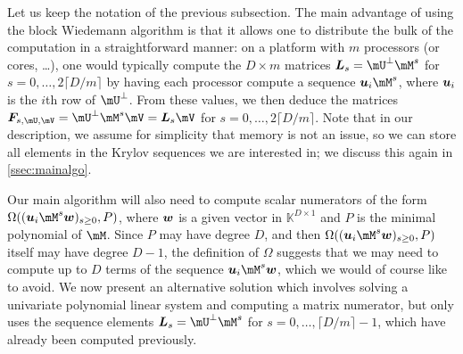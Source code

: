 \documentclass[12pt]{article}
\newcommand{\mat}[1]{\bm{\MakeUppercase{#1}}} %
\newcommand{\row}[1]{\bm{\MakeLowercase{#1}}} %
\newcommand{\col}[1]{\bm{\MakeLowercase{#1}}} %
\newcommand{\seqelt}[1]{\bm{F}_{#1}} %
\newcommand{\minpoly}{P}
\def\K{\mathbb{K}}
\def\K {\ensuremath{\mathbb{K}}}
\begin{document}
Let us keep the notation of the previous subsection.  The main
advantage of using the block Wiedemann algorithm is that it allows one
to distribute the bulk of the computation in a straightforward manner:
on a platform with $m$ processors (or cores, \dots), one would
typically compute the $D \times m$ matrices $\mat{L}_s=\mU^\perp\mM^s$
for $s=0,\dots,2\lceil D/m \rceil$ by having each processor compute a
sequence $\row{u}_i \mM^s$, where $\row{u}_i$ is the $i$th row of
$\mU^\perp$. From these values, we then deduce the matrices
$\seqelt{s,\mU,\mV}=\mU^\perp \mM^s \mV = \mat{L}_s\mV$ for
$s=0,\dots,2\lceil D/m \rceil$. Note that in our description, we
assume for simplicity that memory is not an issue, so we can store all
elements in the Krylov sequences we are interested in; we discuss this
again in \cref{ssec:mainalgo}.

Our main algorithm will also need to compute scalar numerators of
the form \sloppy $\Omega((\row{u}_i \mM^s \col{w})_{s \ge 0},
\minpoly)$, where $\row{w}$ is a given vector in $\K^{D \times 1}$ and
$\minpoly$ is the minimal polynomial of $\mM$. Since $\minpoly$ may
have degree $D$, and then $\Omega((\row{u}_i \mM^s \col{w})_{s \ge 0},
\minpoly)$ itself may have degree $D-1$,
the definition of $\Omega$ suggests that we
may need to compute up to $D$ terms of the sequence $\row{u}_i \mM^s
\col{w}$, which we would of course like to avoid. We now present an
alternative solution which involves solving a univariate polynomial linear system
and computing a matrix numerator, but only uses the sequence elements
$\mat{L}_s= \mU^\perp \mM^s$ for $s=0,\dots,\lceil D/m \rceil-1$,
which have already been computed previously.
\end{document}
